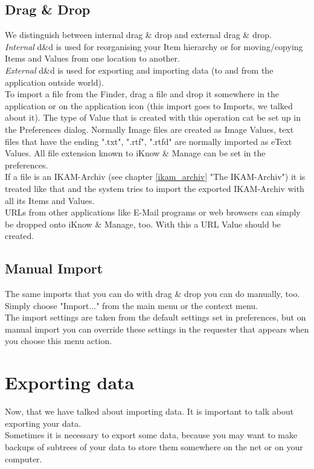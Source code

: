 \documentclass[12pt,a4]{article}
\begin{document}
\subsection{Drag \& Drop}
\label{dd_import}
\medskip
We distinguish between internal drag \& drop and external drag \& drop. \\
\emph{Internal} d\&d is used for reorganising your Item hierarchy or for moving/copying Items and Values from one location to another. \\
\emph{External} d\&d is used for exporting and importing data (to and from the application outside world). \\
To import a file from the Finder, drag a file and drop it somewhere in the application or on the application icon (this import goes to Imports, we talked about it). The type of Value that is created with this operation cat be set up in the Preferences dialog. Normally Image files are created as Image Values, text files that have the ending ".txt", ".rtf", ".rtfd" are normally imported as eText Values. All file extension known to iKnow \& Manage can be set in the preferences. \\
If a file is an IKAM-Archiv (see chapter \ref{ikam_archiv} "The IKAM-Archiv") it is treated like that and the system tries to import the exported IKAM-Archiv with all its Items and Values. \\
URLs from other applications like E-Mail programs or web browsers can simply be dropped onto iKnow \& Manage, too. With this a URL Value should be created.
\subsection{Manual Import}
\label{manual_import}
\medskip
The same imports that you can do with drag \& drop you can do manually, too. Simply choose "Import..." from the main menu or the context menu. \\
The import settings are taken from the default settings set in preferences, but on manual import you can override these settings in the requester that appears when you choose this menu action.
\newpage
\section{Exporting data}
\label{export_data}
\medskip
Now, that we have talked about importing data. It is important to talk about exporting your data. \\
Sometimes it is necessary to export some data, because you may want to make backups of subtrees of your data to store them somewhere on the net or on your computer.
\end{document}

